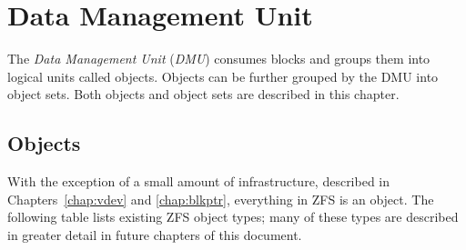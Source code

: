 \chapter{Data Management Unit}\label{chap:dmu}

The \emph{Data Management Unit} (\emph{DMU})
consumes blocks and groups them into logical units called objects.
Objects can be further grouped by the DMU into object sets.
Both objects and object sets are described in this chapter.

\section{Objects}

With the exception of a small amount of infrastructure,
described in Chapters~\ref{chap:vdev} and \ref{chap:blkptr},
everything in ZFS is an object. The following table lists existing ZFS object types;
many of these types are described in greater detail in future chapters of this document.

